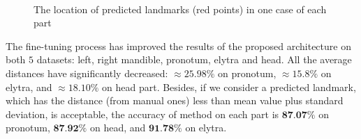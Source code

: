 \documentclass[review]{elsarticle}
\begin{document}
\begin{figure}[h!]
    \centering
    ~~
    \\
    \caption{The location of predicted landmarks (red points) in one case of each part}
    \label{figpdl}
\end{figure}

The fine-tuning process has improved the results of the proposed architecture on both $5$ datasets: left, right mandible, pronotum, elytra and head. All the average distances have significantly decreased: $\approx 25.98\%$ on pronotum, $\approx 15.8\%$ on elytra, and $\approx 18.10\%$  on head part. Besides, if we consider a predicted landmark, which has the distance (from manual ones) less than mean value plus standard deviation, is acceptable, the accuracy of method on each part is $\textbf{87.07\%}$ on pronotum, $\textbf{87.92\%}$ on head, and $\textbf{91.78\%}$ on elytra.
\end{document}

